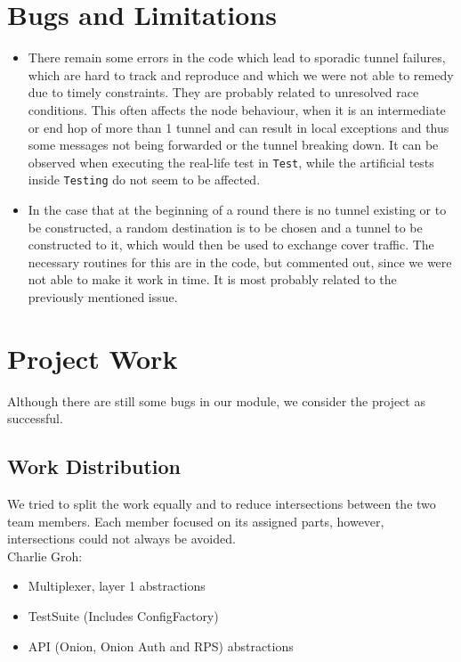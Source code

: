 \documentclass{article}
\begin{document}
\section{Bugs and Limitations}
\begin{itemize}
	\item There remain some errors in the code which lead to sporadic tunnel failures, which are hard to track and reproduce and which we were not able to remedy due to timely constraints. They are probably related to unresolved race conditions. This often affects the node behaviour, when it is an intermediate or end hop of more than 1 tunnel and can result in local exceptions and thus some messages not being forwarded or the tunnel breaking down. It can be observed when executing the real-life test in \texttt{Test}, while the artificial tests inside \texttt{Testing} do not seem to be affected.
	\item In the case that at the beginning of a round there is no tunnel existing or to be constructed, a random destination is to be chosen and a tunnel to be constructed to it, which would then be used to exchange cover traffic. The necessary routines for this are in the code, but commented out, since we were not able to make it work in time. It is most probably related to the previously mentioned issue.
\end{itemize}


\section{Project Work}
Although there are still some bugs in our module, we consider the project as successful.

\subsection{Work Distribution}
We tried to split the work equally and to reduce intersections between the two team members. Each member focused on its assigned parts, however, intersections could not always be avoided. \\

Charlie Groh:
\begin{itemize}
	\item Multiplexer, layer 1 abstractions
	\item TestSuite (Includes ConfigFactory)
	\item API (Onion, Onion Auth and RPS) abstractions \\
\end{itemize}
\end{document}
